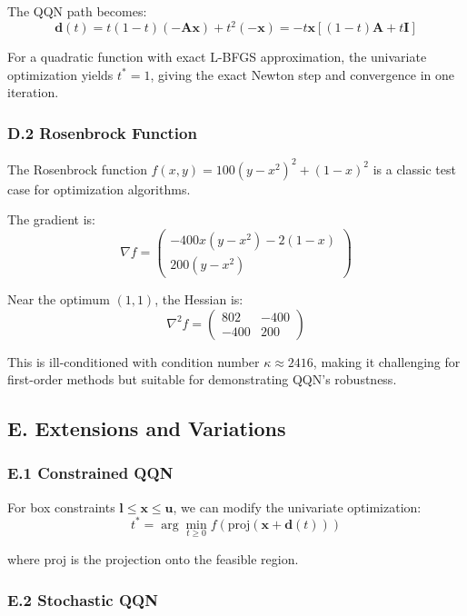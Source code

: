 The QQN path becomes:
\[\mathbf{d}(t) = t(1-t)(-\mathbf{A}\mathbf{x}) + t^2(-\mathbf{x}) = -t\mathbf{x}[(1-t)\mathbf{A} + t\mathbf{I}]\]

For a quadratic function with exact L-BFGS approximation, the univariate optimization yields \(t^* = 1\), giving the exact Newton step and convergence in one iteration.

\hypertarget{d.2-rosenbrock-function}{%
\subsubsection{D.2 Rosenbrock Function}\label{d.2-rosenbrock-function}}

The Rosenbrock function \(f(x,y) = 100(y-x^2)^2 + (1-x)^2\) is a classic test case for optimization algorithms.

The gradient is:
\[\nabla f = \begin{pmatrix} -400x(y-x^2) - 2(1-x) \\ 200(y-x^2) \end{pmatrix}\]

Near the optimum \((1,1)\), the Hessian is:
\[\nabla^2 f = \begin{pmatrix} 802 & -400 \\ -400 & 200 \end{pmatrix}\]

This is ill-conditioned with condition number \(\kappa \approx 2416\), making it challenging for first-order methods but suitable for demonstrating QQN's robustness.

\hypertarget{e.-extensions-and-variations}{%
\subsection{E. Extensions and Variations}\label{e.-extensions-and-variations}}

\hypertarget{e.1-constrained-qqn}{%
\subsubsection{E.1 Constrained QQN}\label{e.1-constrained-qqn}}

For box constraints \(\mathbf{l} \leq \mathbf{x} \leq \mathbf{u}\), we can modify the univariate optimization:
\[t^* = \arg\min_{t \geq 0} f(\text{proj}(\mathbf{x} + \mathbf{d}(t)))\]

where \(\text{proj}\) is the projection onto the feasible region.

\hypertarget{e.2-stochastic-qqn}{%
\subsubsection{E.2 Stochastic QQN}\label{e.2-stochastic-qqn}}

